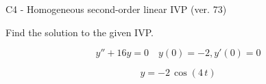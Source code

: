 \begin{exercise}
  \begin{exerciseTitle}C4 - Homogeneous second-order linear IVP (ver. 73)\end{exerciseTitle}
  \begin{exerciseStatement}
    
Find the solution to the given IVP.

    
\[y''+16y = 0 \hspace{1em} y(0) = -2 , y'(0) = 0\]

  \end{exerciseStatement}
  \begin{exerciseAnswer}
    
\[y= -2 \, \cos\left(4 \, t\right)\]

  \end{exerciseAnswer}
\end{exercise}